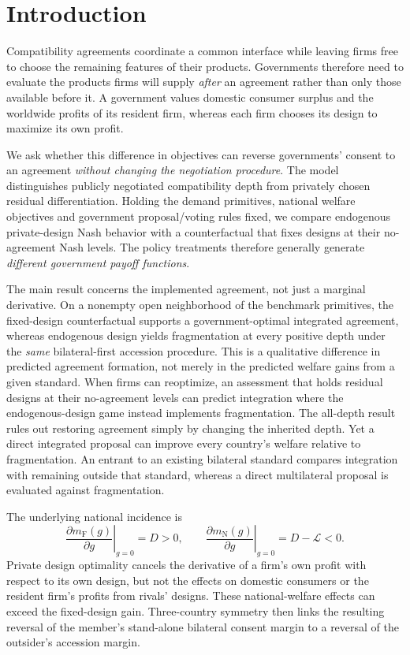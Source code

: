 \documentclass[11pt,a4paper]{article}
\theoremstyle{remark}\newtheorem{remark}[theorem]{Remark}
\newcommand{\N}{\mathrm{N}}\newcommand{\F}{\mathrm{F}}
\newcommand{\loss}{\mathcal L}\newcommand{\vect}[1]{\boldsymbol{#1}}
\begin{document}
\section{Introduction}

Compatibility agreements coordinate a common interface while leaving firms free to choose the remaining features of their products. Governments therefore need to evaluate the products firms will supply \emph{after} an agreement rather than only those available before it. A government values domestic consumer surplus and the worldwide profits of its resident firm, whereas each firm chooses its design to maximize its own profit.

We ask whether this difference in objectives can reverse governments' consent to an agreement \emph{without changing the negotiation procedure}. The model distinguishes publicly negotiated compatibility depth from privately chosen residual differentiation. Holding the demand primitives, national welfare objectives and government proposal/voting rules fixed, we compare endogenous private-design Nash behavior with a counterfactual that fixes designs at their no-agreement Nash levels. The policy treatments therefore generally generate \emph{different government payoff functions}.

The main result concerns the implemented agreement, not just a marginal derivative. On a nonempty open neighborhood of the benchmark primitives, the fixed-design counterfactual supports a government-optimal integrated agreement, whereas endogenous design yields fragmentation at every positive depth under the \emph{same} bilateral-first accession procedure. This is a qualitative difference in predicted agreement formation, not merely in the predicted welfare gains from a given standard. When firms can reoptimize, an assessment that holds residual designs at their no-agreement levels can predict integration where the endogenous-design game instead implements fragmentation. The all-depth result rules out restoring agreement simply by changing the inherited depth. Yet a direct integrated proposal can improve every country's welfare relative to fragmentation. An entrant to an existing bilateral standard compares integration with remaining outside that standard, whereas a direct multilateral proposal is evaluated against fragmentation.

The underlying national incidence is
\begin{equation}\label{eq:introheadline}
\left.\frac{\partial m_{\F}(g)}{\partial g}\right|_{g=0}=D>0,\qquad
\left.\frac{\partial m_{\N}(g)}{\partial g}\right|_{g=0}=D-\loss<0.
\end{equation}
Private design optimality cancels the derivative of a firm's own profit with respect to its own design, but not the effects on domestic consumers or the resident firm's profits from rivals' designs. These national-welfare effects can exceed the fixed-design gain. Three-country symmetry then links the resulting reversal of the member's stand-alone bilateral consent margin to a reversal of the outsider's accession margin.
\end{document}
